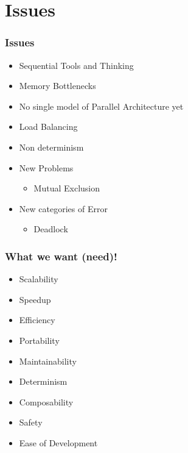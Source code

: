 \documentclass{beamer}
\begin{document}
\section{Issues}
\begin{frame}
	\frametitle{Issues}
\begin{itemize}
	\item Sequential Tools and Thinking
	\item Memory Bottlenecks
	\item No single model of Parallel Architecture yet
	\item Load Balancing
	\item Non determinism
	\item New Problems
\begin{itemize}
	\item Mutual Exclusion 
	\end{itemize}
	\item New categories of Error
	\begin{itemize}
	\item Deadlock
		\end{itemize}
	\end{itemize}	
	
\end{frame}


\begin{frame}
	\frametitle{What we want (need)!}
	\begin{itemize}
	\item Scalability
	\item Speedup
	\item Efficiency
	\item Portability
	\item Maintainability
	\item Determinism
	\item Composability
	\item Safety
	\item Ease of Development
	\end{itemize}
	
\end{frame}

    
\end{document}
